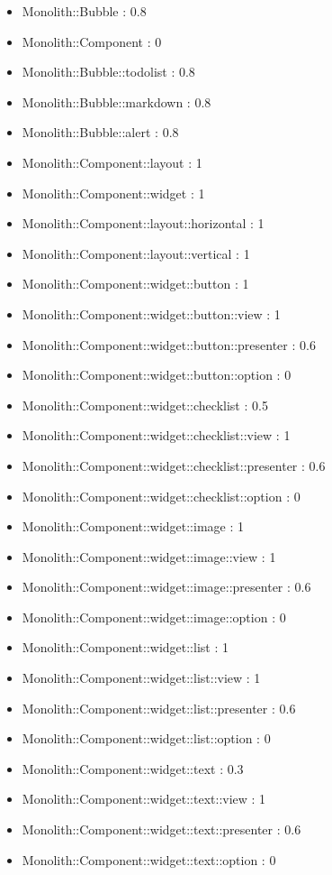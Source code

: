 \begin{itemize}
\item Monolith::Bubble : 0.8
\item Monolith::Component : 0
\item Monolith::Bubble::todolist : 0.8
\item Monolith::Bubble::markdown : 0.8
\item Monolith::Bubble::alert : 0.8
\item Monolith::Component::layout : 1
\item Monolith::Component::widget : 1
\item Monolith::Component::layout::horizontal : 1
\item Monolith::Component::layout::vertical : 1
\item Monolith::Component::widget::button : 1
\item Monolith::Component::widget::button::view : 1
\item Monolith::Component::widget::button::presenter : 0.6
\item Monolith::Component::widget::button::option : 0
\item Monolith::Component::widget::checklist : 0.5
\item Monolith::Component::widget::checklist::view : 1
\item Monolith::Component::widget::checklist::presenter : 0.6
\item Monolith::Component::widget::checklist::option : 0
\item Monolith::Component::widget::image : 1
\item Monolith::Component::widget::image::view : 1
\item Monolith::Component::widget::image::presenter : 0.6
\item Monolith::Component::widget::image::option : 0
\item Monolith::Component::widget::list : 1
\item Monolith::Component::widget::list::view : 1
\item Monolith::Component::widget::list::presenter : 0.6
\item Monolith::Component::widget::list::option : 0
\item Monolith::Component::widget::text : 0.3
\item Monolith::Component::widget::text::view : 1
\item Monolith::Component::widget::text::presenter : 0.6
\item Monolith::Component::widget::text::option : 0
\end{itemize}

